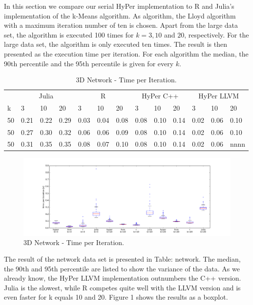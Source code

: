 In this section we compare our serial HyPer implementation to R and Julia’s implementation of the k-Means algorithm. As algorithm, the Lloyd algorithm with a maximum iteration number of ten is chosen. Apart from the large data set, the algorithm is executed 100 times for $k = 3, 10$ and $20$, respectively. For the large data set, the algorithm is only executed ten times. The result is then presented as the execution time per iteration. For each algorithm the median, the 90th percentile and the 95th percentile is given for every $k$. 
\\
\begin{table}[htsb]
  \caption[3D Network - Time per Iteration]{3D Network - Time per Iteration.}
  \label{tab:network_all}
  \centering
  \begin{tabular}{l l l l l l l l l l l l l}
    \toprule
      & \multicolumn{3}{c}{Julia} & \multicolumn{3}{c}{R} & \multicolumn{3}{c}{HyPer C++} & \multicolumn{3}{c}{HyPer LLVM}  \\
      k & 3 & 10 & 20 & 3 & 10 & 20 & 3 & 10 & 20 & 3 & 10 & 20 \\
    \midrule
      50  & 0.21 & 0.22 & 0.29 & 0.03 & 0.04 & 0.08 & 0.08 & 0.10 & 0.14 & 0.02 & 0.06 & 0.10 \\
      50  & 0.27 & 0.30 & 0.32 & 0.06 & 0.06 & 0.09 & 0.08 & 0.10 & 0.14 & 0.02 & 0.06 & 0.10 \\
      50  & 0.31 & 0.35 & 0.35 & 0.08 & 0.07 & 0.10 & 0.08 & 0.10 & 0.14 & 0.02 & 0.06 & nnnn \\
    \bottomrule
  \end{tabular}
\end{table}

\begin{figure}[htsb]
  \raggedleft
  \includegraphics[scale=0.4, trim="0cm 1cm 0cm 0cm"]{figures/charts/network_all}
  \caption[3D Network - Time per Iteration]{3D Network - Time per Iteration.}
  \label{fig:network_all}
\end{figure}

The result of the network data set is presented in Table: network. The median, the 90th and 95th percentile are listed to show the variance of the data. As we already know, the HyPer LLVM implementation outnumbers  the C++ version. Julia is the slowest, while R competes quite well with the LLVM version and is even faster for k equals 10 and 20. Figure 1 shows the results as a boxplot.

